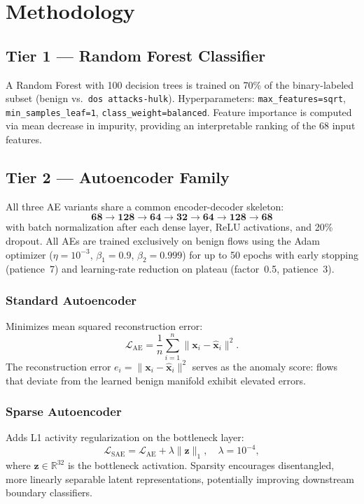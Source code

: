 \documentclass[10pt,journal,compsoc]{IEEEtran}
\begin{document}
\section{Methodology}
\label{sec:method}

\subsection{Tier 1 — Random Forest Classifier}

A Random Forest \cite{breiman2001} with 100 decision trees is trained
on 70\% of the binary-labeled subset (benign vs.\ \texttt{dos
attacks-hulk}).  Hyperparameters: \texttt{max\_features=sqrt},
\texttt{min\_samples\_leaf=1}, \texttt{class\_weight=balanced}.
Feature importance is computed via mean decrease in impurity, providing
an interpretable ranking of the 68 input features.

\subsection{Tier 2 — Autoencoder Family}

All three AE variants share a common encoder-decoder skeleton:
\begin{equation}
  \mathbf{68} \!\to\! \mathbf{128} \!\to\! \mathbf{64}
  \!\to\! \boldsymbol{32} \!\to\! \mathbf{64}
  \!\to\! \mathbf{128} \!\to\! \mathbf{68}
\end{equation}
with batch normalization after each dense layer, ReLU activations, and
20\% dropout.  All AEs are trained exclusively on benign flows using
the Adam optimizer ($\eta = 10^{-3}$, $\beta_1=0.9$, $\beta_2=0.999$)
for up to 50 epochs with early stopping (patience~7) and learning-rate
reduction on plateau (factor~0.5, patience~3).

\subsubsection{Standard Autoencoder}
Minimizes mean squared reconstruction error:
\begin{equation}
  \mathcal{L}_{\text{AE}} = \frac{1}{n}\sum_{i=1}^{n}
    \|\mathbf{x}_i - \hat{\mathbf{x}}_i\|^2.
\end{equation}
The reconstruction error $e_i = \|\mathbf{x}_i - \hat{\mathbf{x}}_i\|^2$
serves as the anomaly score: flows that deviate from the learned
benign manifold exhibit elevated errors.

\subsubsection{Sparse Autoencoder}
Adds L1 activity regularization on the bottleneck layer:
\begin{equation}
  \mathcal{L}_{\text{SAE}} = \mathcal{L}_{\text{AE}}
    + \lambda\|\mathbf{z}\|_1, \quad \lambda = 10^{-4},
\end{equation}
where $\mathbf{z} \in \mathbb{R}^{32}$ is the bottleneck activation.
Sparsity encourages disentangled, more linearly separable latent
representations, potentially improving downstream boundary classifiers.
\end{document}
